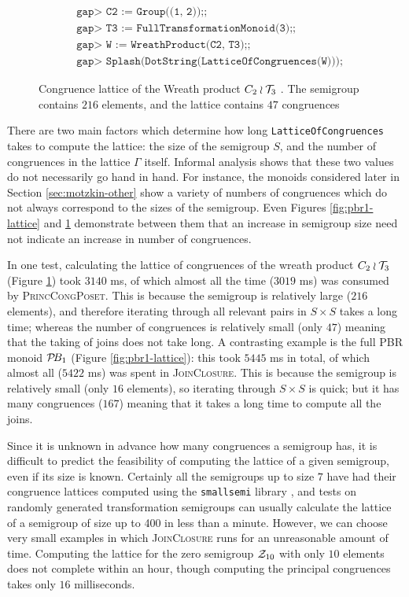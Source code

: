 \begin{figure}[h]
  \begin{align*}
    &\texttt{gap> C2 := Group((1, 2));;} \\
    &\texttt{gap> T3 := FullTransformationMonoid(3);;} \\
    &\texttt{gap> W := WreathProduct(C2, T3);;} \\
    &\texttt{gap> Splash(DotString(LatticeOfCongruences(W)));}
  \end{align*}
  \vspace{-1.0cm}
  \caption[Congruence lattice of the Wreath product $C_2 \wr \T_3$]
  {Congruence lattice of the Wreath product $C_2 \wr \T_3$
    \cite[\S10.1]{wreath}.  The semigroup contains $216$ elements, and the
    lattice contains $47$ congruences}
  \label{fig:c2-wr-t3-lattice}
\end{figure}

There are two main factors which determine how long
\texttt{LatticeOfCongruences} takes to compute the lattice: the size of the
semigroup $S$, and the number of congruences in the lattice $\Gamma$ itself.
Informal analysis shows that these two values do not necessarily go hand in
hand.  For instance, the monoids considered later in Section
\ref{sec:motzkin-other} show a variety of numbers of congruences which do not
always correspond to the sizes of the semigroup.  Even Figures
\ref{fig:pbr1-lattice} and \ref{fig:c2-wr-t3-lattice} demonstrate between them
that an increase in semigroup size need not indicate an increase in number of
congruences.

In one test, calculating the lattice of congruences of the wreath product
$C_2 \wr \T_3$ (Figure \ref{fig:c2-wr-t3-lattice}) took $3140$ ms, of which
almost all the time ($3019$ ms) was consumed by \textsc{PrincCongPoset}.  This
is because the semigroup is relatively large ($216$ elements), and therefore
iterating through all relevant pairs in $S \times S$ takes a long time; whereas
the number of congruences is relatively small (only $47$) meaning that the
taking of joins does not take long.  A contrasting example is the full PBR
monoid $\mathcal{P}\!B_1$ (Figure \ref{fig:pbr1-lattice}): this took $5445$ ms in total,
of which almost all ($5422$ ms) was spent in \textsc{JoinClosure}.  This is
because the semigroup is relatively small (only $16$ elements), so iterating
through $S \times S$ is quick; but it has many congruences ($167$) meaning that
it takes a long time to compute all the joins.

Since it is unknown in advance how many congruences a semigroup has, it is
difficult to predict the feasibility of computing the lattice of a given
semigroup, even if its size is known.  Certainly all the semigroups up to size
$7$ have had their congruence lattices computed using the \texttt{smallsemi}
library \cite{smallsemi}, and tests on randomly generated transformation
semigroups can usually calculate the lattice of a semigroup of size up to 400 in
less than a minute.  However, we can choose very small examples in which
\textsc{JoinClosure} runs for an unreasonable amount of time.  Computing the
lattice for the zero semigroup $\mathcal{Z}_{10}$ with only $10$ elements does not
complete within an hour, though computing the principal congruences takes
only $16$ milliseconds.

